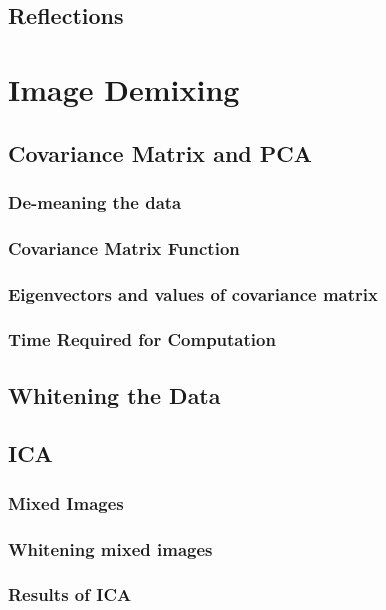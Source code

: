 \documentclass[11pt, oneside]{article}
\begin{document}
\subsection{Reflections}

\section{Image Demixing}

\subsection{Covariance Matrix and PCA}

\subsubsection{De-meaning the data}

\subsubsection{Covariance Matrix Function}

\subsubsection{Eigenvectors and values of covariance matrix}

\subsubsection{Time Required for Computation}

\subsection{Whitening the Data}

\subsection{ICA}

\subsubsection{Mixed Images}

\subsubsection{Whitening mixed images}

\subsubsection{Results of ICA}
\end{document}

